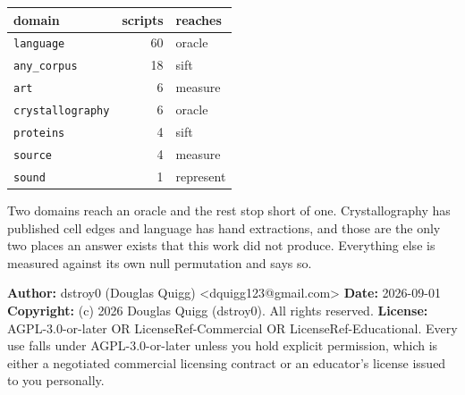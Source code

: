 \begin{center}
\begin{tabular}{@{}>{\raggedright\arraybackslash}p{}rl@{}}
\toprule
domain & scripts & reaches \\
\midrule
\texttt{language}        & 60 & oracle \\
\texttt{any\_corpus}     & 18 & sift \\
\texttt{art}             &  6 & measure \\
\texttt{crystallography} &  6 & oracle \\
\texttt{proteins}        &  4 & sift \\
\texttt{source}          &  4 & measure \\
\texttt{sound}           &  1 & represent \\
\bottomrule
\end{tabular}
\end{center}

Two domains reach an oracle and the rest stop short of one. Crystallography has published cell
edges and language has hand extractions, and those are the only two places an answer exists that
this work did not produce. Everything else is measured against its own null permutation and says
so.

\medskip

\textbf{Author:} dstroy0 (Douglas Quigg) <dquigg123@gmail.com> \textbf{Date:} 2026-09-01 \textbf{Copyright:} (c) 2026 Douglas Quigg (dstroy0). All rights reserved. \textbf{License:} AGPL-3.0-or-later OR LicenseRef-Commercial OR LicenseRef-Educational. Every use falls under AGPL-3.0-or-later unless you hold explicit permission, which is either a negotiated commercial licensing contract or an educator's license issued to you personally.

